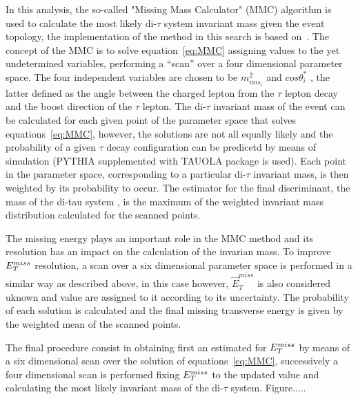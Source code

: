 In this analysis, the so-called "Missing Mass Calculator" (MMC) algorithm
is used to calculate the most likely di-$\tau$ system invariant mass given the event topology, %
the implementation of the method in this search is based on~\cite{MMC}. 
The concept of the MMC is to solve equation~\ref{eq:MMC} assigning values to the yet undetermined variables, performing a 
``scan'' over a four dimensional parameter space. The four independent  variables are chosen 
to be $ m^2_{mis_{i}}$ and $cos\theta^*_i$ , the latter defined
as the angle between the charged lepton from the $\tau$ lepton decay and the boost direction of the $\tau$ lepton. 
The di-$\tau$ invariant mass of the event can be calculated for each given point of the parameter space that solves equations~\ref{eq:MMC},
however, the solutions are not all equally likely and  the probability of a given $\tau$ decay configuration can be predicetd by means
of simulation (PYTHIA supplemented with TAUOLA package is used). Each point in the parameter space, corresponding
to a particular di-$\tau$ invariant mass, is then weighted by its probability to occur. 
The estimator for the final discriminant, the mass of the di-tau system \mmc, 
is the maximum of the weighted invariant mass distribution calculated for the scanned points.

The missing energy plays an important role in the MMC method and  its resolution has an impact on the calculation
of the invarian mass. To improve $E_{T}^{miss}$ resolution, a scan over a six dimensional parameter space is performed 
in a similar way as described above, in this case however, $\vec{E}_T^{miss}$ is also considered uknown and value are assigned 
to it according to its uncertainty. The probability of each solution is calculated and the final missing transverse
energy is given by the weighted mean of the scanned points. 

The final procedure consist in obtaining first an estimated for $E_{T}^{miss}$ by means of a six dimensional scan over the solution of equations~\ref{eq:MMC},
successively a four dimensional scan is performed fixing $E_{T}^{miss}$ to the updated value and calculating the most likely invariant mass 
of the di-$\tau$ system. Figure.....


 

